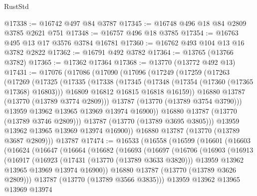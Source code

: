 \begin{lexlean}{RustStd}
\begin{coremodule}
@17338 := @16742 @497 @84 @3787
@17345 := @16748 @496 @18 @84 @2809 @3785 @2621 @751
@17348 := @16757 @496 @18 @3785
@17354 := @16763 @495 @13 @17 @3576 @3784 @16781
@17360 := @16762 @493 @104 @13 @16 @3782 @2822
@17362 := @16791 @492 @3782
@17364 := @13765 (@13766 @3782)
@17365 := @17362 @17364
@17368 := @13770 (@13772 @492 @13)
@17431 := @17076
    (@17086
      (@17090
        (@17096
          (@17249
            (@17259
              (@17263
                (@17269
                  (@17325
                    (@17335
                      (@17338
                        (@17345
                          (@17348 (@17354 (@17360 (@17365 @17368) @16803)))
                          @16809
                          @16812
                          @16815
                          @16818
                          @16159))
                      @16880
                      @13787
                      (@13770 (@13789 @3774 @2809)))
                    @13787
                    (@13770 (@13789 @3754 @3790)))
                  @13959
                  @13962
                  @13965
                  @13969
                  @13974
                  @16900))
              @16880
              @13787
              (@13770 (@13789 @3746 @2809)))
            @13787
            (@13770 (@13789 @3695 @3805)))
          @13959
          @13962
          @13965
          @13969
          @13974
          @16900))
      @16880
      @13787
      (@13770 (@13789 @3687 @2809)))
    @13787
@17474 := @16533
    (@16558
      (@16599
        (@16601
          (@16603
            (@16624
              (@16647
                (@16664
                  (@16682
                    (@16693
                      (@16697
                        (@16706
                          (@16903
                            (@16913
                              (@16917
                                (@16923
                                  (@17431 (@13770 (@13789 @3633 @3820)))
                                  @13959
                                  @13962
                                  @13965
                                  @13969
                                  @13974
                                  @16900))
                              @16880
                              @13787
                              (@13770 (@13789 @3626 @2809)))
                            @13787
                            (@13770 (@13789 @3566 @3835)))
                          @13959
                          @13962
                          @13965
                          @13969
                          @13974

\end{coremodule}
\end{lexlean}
